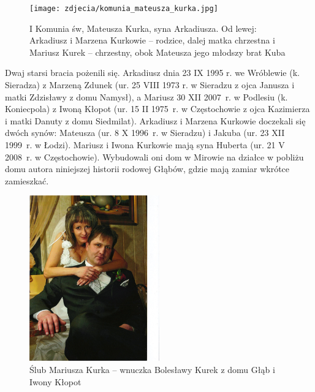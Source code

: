 \begin{figure}[!h]
\begin{center}
\texttt{[image: zdjecia/komunia\_mateusza\_kurka.jpg]}
\caption[I Komunia św, Mateusza Kurka]{I Komunia św, Mateusza Kurka, syna Arkadiusza. Od lewej: Arkadiusz i Marzena Kurkowie -- rodzice, dalej matka chrzestna i Mariusz Kurek -- chrzestny, obok Mateusza jego młodszy brat Kuba}
\label{rys:komunia_mateusza_kurka}
\end{center}
\end{figure}

Dwaj starsi bracia pożenili się. Arkadiusz dnia 23 IX 1995 r. we Wróblewie (k. Sieradza) z Marzeną Zdunek (ur. 25 VIII 1973 r. w Sieradzu z ojca Janusza i matki Zdzisławy z domu Namysł), a Mariusz 30 XII 2007~r. w Podlesiu (k. Koniecpola) z Iwoną Kłopot (ur. 15 II 1975~r. w Częstochowie z ojca Kazimierza i matki Danuty z domu Siedmilat). Arkadiusz i Marzena Kurkowie doczekali się dwóch synów: Mateusza (ur. 8 X 1996~r. w Sieradzu) i Jakuba (ur. 23 XII 1999~r. w Łodzi). Mariusz i Iwona Kurkowie mają syna Huberta (ur. 21 V 2008~r. w Częstochowie). Wybudowali oni dom w Mirowie na działce w pobliżu domu autora niniejszej historii rodowej Głąbów, gdzie mają zamiar wkrótce zamieszkać.

\begin{figure}[!h]
\begin{center}
\includegraphics[width=0.5\textwidth]{zdjecia/mariusz_i_iwona_kurek.jpg}
\caption[Ślub Mariusza Kurka z Iwoną Kłopot]{Ślub Mariusza Kurka -- wnuczka Bolesławy Kurek z domu Głąb i Iwony Kłopot}
\label{rys:mariusz_i_iwona_kurek}
\end{center}
\end{figure}


